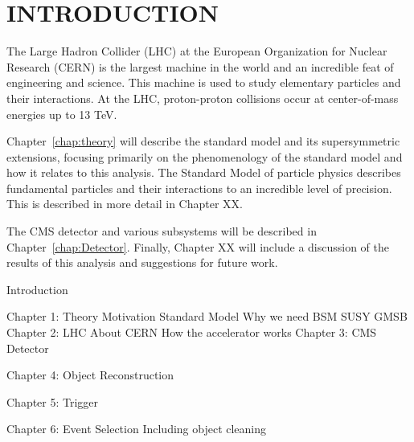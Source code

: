 \chapter{INTRODUCTION}

The Large Hadron Collider (LHC) at the European Organization for Nuclear Research (CERN) is the largest machine in the world and an incredible feat of engineering and science. This machine is used to study elementary particles and their interactions. At the LHC, proton-proton collisions occur at center-of-mass energies up to 13 TeV. 

Chapter~\ref{chap:theory} will describe the standard model and its supersymmetric extensions, focusing primarily on the phenomenology of the standard model and how it relates to this analysis. 
The Standard Model of particle physics describes fundamental particles and their interactions to an incredible level of precision. This is described in more detail in  Chapter XX. 

The CMS detector and various subsystems will be described in Chapter~\ref{chap:Detector}. Finally, Chapter XX will include a discussion of the results of this analysis and suggestions for future work.

Introduction

Chapter 1: Theory Motivation
	Standard Model
	Why we need BSM
	SUSY
	GMSB
Chapter 2: LHC
	About CERN
	How the accelerator works
Chapter 3: CMS Detector

Chapter 4: Object Reconstruction

Chapter 5: Trigger

Chapter 6: Event Selection
	Including object cleaning
	
